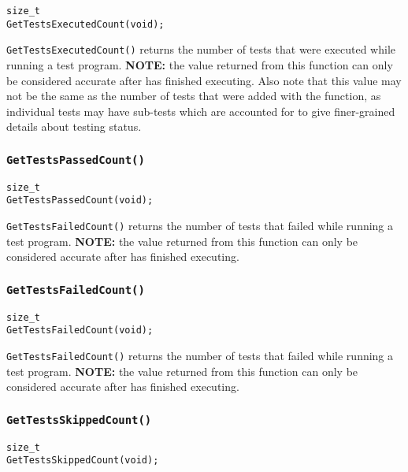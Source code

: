 \documentclass[../HDF5_RFC.tex]{subfiles}
\begin{document}
\begin{verbatim}
size_t
GetTestsExecutedCount(void);
\end{verbatim}

\texttt{GetTestsExecutedCount()} returns the number of tests that were executed while running a test
program. \textbf{NOTE:} the value returned from this function can only be considered accurate after
 has finished executing. Also note that this value may not be
the same as the number of tests that were added with the  function, as
individual tests may have sub-tests which are accounted for to give finer-grained details about testing
status.

\subsubsection{\texttt{GetTestsPassedCount()}}

\begin{verbatim}
size_t
GetTestsPassedCount(void);
\end{verbatim}

\texttt{GetTestsFailedCount()} returns the number of tests that failed while running a test program.
\textbf{NOTE:} the value returned from this function can only be considered accurate after
 has finished executing.

\subsubsection{\texttt{GetTestsFailedCount()}}

\begin{verbatim}
size_t
GetTestsFailedCount(void);
\end{verbatim}

\texttt{GetTestsFailedCount()} returns the number of tests that failed while running a test program.
\textbf{NOTE:} the value returned from this function can only be considered accurate after
 has finished executing.

\subsubsection{\texttt{GetTestsSkippedCount()}}

\begin{verbatim}
size_t
GetTestsSkippedCount(void);
\end{verbatim}
\end{document}
